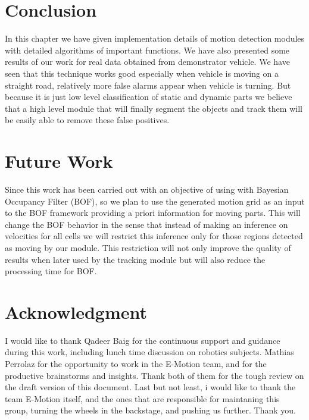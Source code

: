 \section{Conclusion}
In this chapter we have given implementation details of motion detection modules with detailed algorithms of important functions. We have also presented some results of our work for real data obtained from demonstrator vehicle. We have seen that this technique works good especially when vehicle is moving on a straight road, relatively more false alarms appear when vehicle is turning. But because it is just low level classification of static and dynamic parts we believe that a high level module that will finally segment the objects and track them will be easily able to remove these false positives.

\section{Future Work}
Since this work has been carried out with an objective of using with Bayesian Occupancy Filter (BOF), so we plan to use the generated motion grid as an input to the BOF framework providing a priori information for moving parts. This will change the BOF behavior in the sense that instead of making an inference on velocities for all cells we will restrict this inference only for those regions detected as moving by our module. This restriction will not only improve the quality of results when later used by the tracking module but will also reduce the processing time for BOF.

\section{Acknowledgment}

I would like to thank Qadeer Baig for the continuous support and guidance during this work, including lunch time discussion on robotics subjects. Mathias Perrolaz for the opportunity to work in the E-Motion team, and for the productive brainstorms and insights. Thank both of them for the tough review on the draft version of this document. Last but not least, i would like to thank the team E-Motion itself, and the ones that are responsible for maintaning this group, turning the wheels in the backstage, and pushing us further. Thank you.